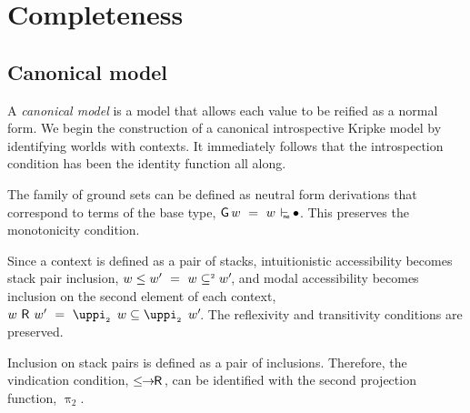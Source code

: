 \documentclass[submission,copyright,creativecommons,sharealike,backref=page]{eptcs}
\renewcommand{\leq}{\mathrel{\subseteq}}
\newcommand{\leqII}{\mathrel{\subseteq^{\scriptscriptstyle{2}}}}
\newcommand{\R}{\mathrel{\rlap{$\mkern.75mu\textsf{R}$}\hphantom{\subseteq}}}
\renewcommand{\:}{\mathop{\mkern3mu:\mkern3mu}}
\renewcommand{\.}{\mathop{\mkern3mu.\mkern3mu}}
\renewcommand{\;}{\mathop{;}}
\renewcommand{\,}{\mathop{,}}
\newcommand{\ene}{\mathrel{\mkern2mu\vdash_{\mkern-9mu\rlap{$\scriptscriptstyle{\textsf{ne}}$}\hphantom{\scriptscriptstyle{\textsf{nf}}}}}}
\renewcommand{\r}{\mathrel{\rightarrow\mkern-1mu}}
\newcommand{\piii}{\operatorname{\uppi_{\scriptscriptstyle{2}}}}
\newcommand{\lerR}{\operatorname{\le\mkern-1mu\r\mkern-1mu\R}}
\newcommand{\G}{\operatorname{\textsf{G}}}
\newcommand{\base}{\mathop{\bullet}}
\theoremstyle{mystyle}
\begin{document}
\section{Completeness}\label{Completeness}

\subsection{Canonical model}

A \emph{canonical model} is a model that allows each value to be reified as a normal form.  We begin the construction of a canonical introspective Kripke model by identifying worlds with contexts.  It immediately follows that the introspection condition has been the identity function all along.

The family of ground sets can be defined as neutral form derivations that correspond to terms of the base type, $\G w ~=~ w \ene \base$.  This preserves the monotonicity condition.

Since a context is defined as a pair of stacks, intuitionistic accessibility becomes stack pair inclusion, $w \le w' ~=~ w \leqII w'\mkern-3mu$, and modal accessibility becomes inclusion on the second element of each context, $w \R w' ~=~ \piii~w \leq \piii~w'\mkern-3mu$.  The reflexivity and transitivity conditions are preserved.

Inclusion on stack pairs is defined as a pair of inclusions.  Therefore, the vindication condition, $\lerR$, can be identified with the second projection function, $\piii$.
\end{document}
